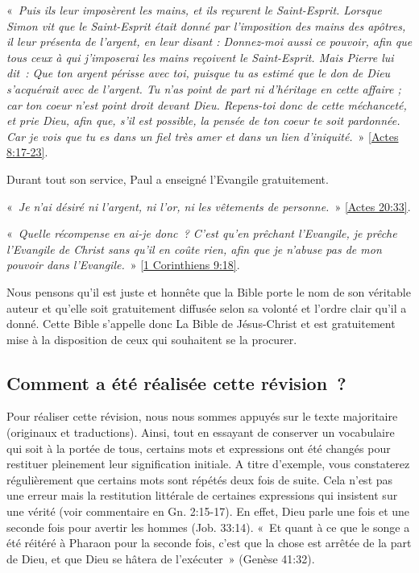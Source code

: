 \begin{small}
«~\emph{Puis ils leur imposèrent les mains, et ils reçurent le Saint-Esprit. Lorsque Simon vit que le Saint-Esprit était donné par l’imposition des mains des apôtres, il leur présenta de l’argent, en leur disant : Donnez-moi aussi ce pouvoir, afin que tous ceux à qui j’imposerai les mains reçoivent le Saint-Esprit. Mais Pierre lui dit~: Que ton argent périsse avec toi, puisque tu as estimé que le don de Dieu s’acquérait avec de l’argent. Tu n’as point de part ni d’héritage en cette affaire ; car ton coeur n’est point droit devant Dieu. Repens-toi donc de cette méchanceté, et prie Dieu, afin que, s’il est possible, la pensée de ton coeur te soit pardonnée. Car je vois que tu es dans un fiel très amer et dans un lien d’iniquité.}~» \vref{Actes 8:17-23}. 

Durant tout son service, Paul a enseigné l'Evangile gratuitement.

«~\emph{Je n'ai désiré ni l'argent, ni l'or, ni les vêtements de personne.}~» \vref{Actes 20:33}.

«~\emph{Quelle récompense en ai-je donc~? C’est qu’en prêchant l’Evangile, je prêche l’Evangile de Christ sans qu’il en coûte rien, afin que je n’abuse pas de mon pouvoir dans l’Evangile.}~» \vref{1 Corinthiens 9:18}.

Nous pensons qu'il est juste et honnête que la Bible porte le nom de son véritable auteur et qu'elle soit gratuitement diffusée selon sa volonté et l'ordre clair qu'il a donné. Cette Bible s'appelle donc La Bible de Jésus-Christ et est gratuitement mise à la disposition de ceux qui souhaitent se la procurer. 

\subsection*{Comment a été réalisée cette révision~?}

Pour réaliser cette révision, nous nous sommes appuyés sur le texte majoritaire (originaux et traductions). Ainsi, tout en essayant de conserver un vocabulaire qui soit à la portée de tous, certains mots et expressions ont été changés pour restituer pleinement leur signification initiale. A titre d'exemple, vous constaterez régulièrement que certains mots sont répétés deux fois de suite. Cela n'est pas une erreur mais la restitution littérale de certaines expressions qui insistent sur une vérité (voir commentaire en Gn. 2:15-17). En effet, Dieu parle une fois et une seconde fois pour avertir les hommes (Job. 33:14). «~Et quant à ce que le songe a été réitéré à Pharaon pour la seconde fois, c'est que la chose est arrêtée de la part de Dieu, et que Dieu se hâtera de l'exécuter~» (Genèse 41:32).


\end{small}
